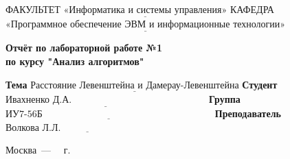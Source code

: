 \begin{titlepage}
	
	\noindent ФАКУЛЬТЕТ $\underline{\text{«Информатика и системы управления»}}$ \newline\newline
	\noindent КАФЕДРА $\underline{\text{«Программное обеспечение ЭВМ и информационные технологии»}}$\newline\newline\newline\newline\newline\newline\newline
	
	\vspace{\baselineskip}

	\begin{center}
		\noindent\begin{minipage}{0.71\textwidth}\centering
			\Large\textbf{Отчёт по лабораторной работе №1\\по курсу "Анализ алгоритмов"}\newline\newline
		\end{minipage}
	\end{center}

	\noindent\textbf{Тема} $\underline{\text{Расстояние Левенштейна и Дамерау-Левенштейна}}$\newline\newline\newline
	\noindent\textbf{Студент} $\underline{\text{Ивахненко Д.А.~~~~~~~~~~~~~~~~~~~~~~~~~~~~~~~~~~~~~~~~~~}}$\newline\newline
	\noindent\textbf{Группа} $\underline{\text{ИУ7-56Б~~~~~~~~~~~~~~~~~~~~~~~~~~~~~~~~~~~~~~~~~~~~~~~~~~~~~}}$\newline\newline
	\noindent\textbf{Преподаватель} $\underline{\text{Волкова Л.Л.~~~~~~~~~~~~~~~~~~~~~~~~~~~~~~~~~~}}$\newline
	
	\begin{center}
		\vfill
		Москва~---~\the\year
		~г.
	\end{center}
 \restoregeometry
\end{titlepage}